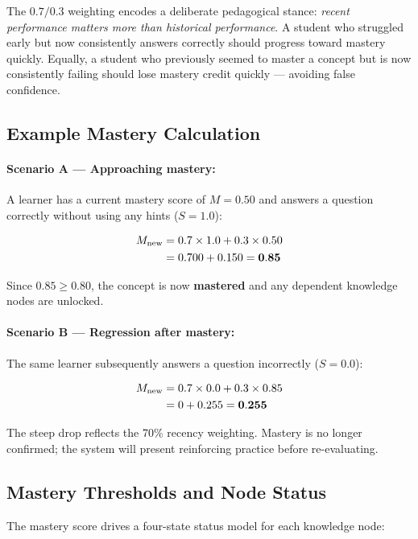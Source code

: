 \documentclass[12pt,a4paper]{article}
\begin{document}
\noindent The $0.7/0.3$ weighting encodes a deliberate pedagogical stance:
\emph{recent performance matters more than historical performance}.  A student
who struggled early but now consistently answers correctly should progress
toward mastery quickly.  Equally, a student who previously seemed to master a
concept but is now consistently failing should lose mastery credit quickly —
avoiding false confidence.

\subsection{Example Mastery Calculation}

\paragraph{Scenario A — Approaching mastery:}
A learner has a current mastery score of $M = 0.50$ and answers a question
correctly without using any hints ($S = 1.0$):

\begin{align}
  M_{\text{new}} &= 0.7 \times 1.0 + 0.3 \times 0.50 \notag \\
                 &= 0.700 + 0.150 = \mathbf{0.85}
\end{align}

Since $0.85 \geq 0.80$, the concept is now \textbf{mastered} and any
dependent knowledge nodes are unlocked.

\paragraph{Scenario B — Regression after mastery:}
The same learner subsequently answers a question incorrectly ($S = 0.0$):

\begin{align}
  M_{\text{new}} &= 0.7 \times 0.0 + 0.3 \times 0.85 \notag \\
                 &= 0 + 0.255 = \mathbf{0.255}
\end{align}

The steep drop reflects the 70\% recency weighting.  Mastery is no longer
confirmed; the system will present reinforcing practice before re-evaluating.

\subsection{Mastery Thresholds and Node Status}

The mastery score drives a four-state status model for each knowledge node:
\end{document}
